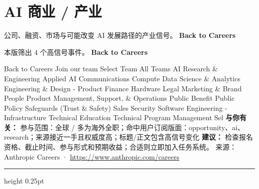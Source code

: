 \documentclass[10.5pt]{ctexart}
\begin{document}
\section*{AI 商业 / 产业}
{\color{ormuted} 公司、融资、市场与可能改变 AI 发展路径的产业信号。}
\vspace{2mm}
{\LARGE\bfseries Back to Careers}\par
\vspace{1mm}
{\color{ormuted} 本版筛出 4 个高信号事件。}
\vspace{3mm}
{\Large\bfseries Back to Careers}\par
Back to Careers Join our team Select Team All Teams AI Research \& Engineering Applied AI Communications Compute Data Science \& Analytics Engineering \& Design - Product Finance Hardware Legal Marketing \& Brand People Product Management, Support, \& Operations Public Benefit Public Policy Safeguards (Trust \& Safety) Sales Security Software Engineering - Infrastructure Technical Education Technical Program Management Sel
\textbf{与你有关：} 参与范围：全球 / 多为海外全职；命中用户订阅版面：opportunity、ai、research；来源接近一手且权威度高；标题/正文包含高信号变化
\textbf{建议：} 检查报名资格、截止时间、参与形式和预期收益；合适则立即加入任务系统。
{\footnotesize\color{ormuted} 来源：Anthropic Careers · \url{https://www.anthropic.com/careers}}
\vspace{4mm}
\hrule height 0.25pt
\vspace{3mm}
\end{document}
